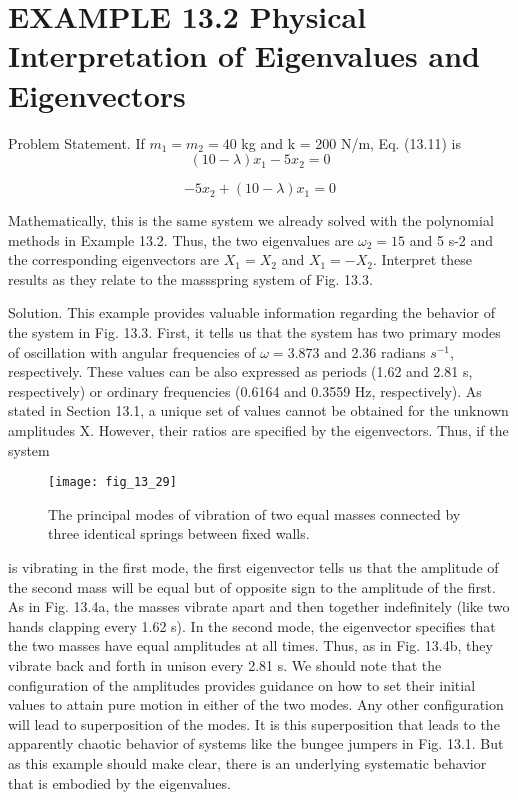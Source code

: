 \documentclass[../main.tex]{subfiles}
\begin{document}
\section*{EXAMPLE 13.2 Physical Interpretation of Eigenvalues and Eigenvectors}
Problem Statement. If $m_{1} = m_{2} = 40$ kg and k = 200 N/m, Eq. (13.11) is
\begin{equation}
(10-\lambda )x_{1}-5x_{2}=0
\end{equation}

\begin{equation}
-5x_{2}+(10-\lambda )x_{1}=0
\end{equation}

Mathematically, this is the same system we already solved with the polynomial methods in
Example 13.2. Thus, the two eigenvalues are $\omega_{2} = 15$ and 5 s-2 and the corresponding
eigenvectors are $X_{1} = X_{2}$ and $X_{1} = -X_{2}$. Interpret these results as they relate to the massspring system of Fig. 13.3.


Solution. This example provides valuable information regarding the behavior of the system in Fig. 13.3. First, it tells us that the system has two primary modes of oscillation with
angular frequencies of $\omega = 3.873$ and 2.36 radians $s^{-1}$, respectively. These values can be
also expressed as periods (1.62 and 2.81 s, respectively) or ordinary frequencies (0.6164 and 0.3559 Hz, respectively).
As stated in Section 13.1, a unique set of values cannot be obtained for the unknown
amplitudes X. However, their ratios are specified by the eigenvectors. Thus, if the system
\begin{figure}[H]
		\centering
		\texttt{[image: fig\_13\_29]}
	   \caption{\textsf{The principal modes of vibration of two equal masses connected by three identical springs
between fixed walls.}}
	   \label{fig:fig_13_29}
\end{figure}
is vibrating in the first mode, the first eigenvector tells us that the amplitude of the second
mass will be equal but of opposite sign to the amplitude of the first. As in Fig. 13.4a, the
masses vibrate apart and then together indefinitely (like two hands clapping every 1.62 s).
In the second mode, the eigenvector specifies that the two masses have equal
amplitudes at all times. Thus, as in Fig. 13.4b, they vibrate back and forth in unison every
2.81 s. We should note that the configuration of the amplitudes provides guidance on how
to set their initial values to attain pure motion in either of the two modes. Any other configuration will lead to superposition of the modes. It is this superposition that leads to the
apparently chaotic behavior of systems like the bungee jumpers in Fig. 13.1. But as this example should make clear, there is an underlying systematic behavior that is embodied by
the eigenvalues.
\end{document}
